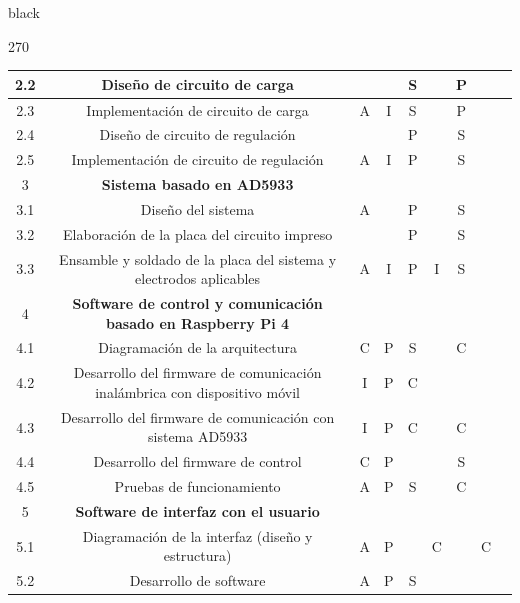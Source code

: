 \documentclass[11pt]{charter}
\begin{document}
\begin{consigna}{black}
\begin{table}[htpb]
\begin{turn}{270}
{\begin{tabular}{|c|c|c|c|c|c|c|c|c|}
2.2 & Diseño de circuito de carga &  &  & S &  & 	P &  & \\ \hline
2.3 & Implementación de circuito de carga & A & I & S &  & 	P &  & \\ \hline
2.4 & Diseño de circuito de regulación &  &  & P &  &	S &  & \\ \hline
2.5 & Implementación de circuito de regulación &  A & I & P &  & 	S &  & \\ \hline
3	 & \textbf{Sistema basado en AD5933}	&  &  &  &  &  &  & \\ \hline						
3.1	 & Diseño del sistema & A &  &	P & & S &  & \\ \hline
3.2	 & Elaboración de la placa del circuito impreso  & & & P & & S & & \\ \hline
3.3	 & Ensamble y soldado de la placa del sistema y electrodos aplicables &A &I &P &I & S &  & \\ \hline

								
4 & \textbf{Software de control y comunicación basado en Raspberry Pi 4} &  &  &  &  &  &  & \\ \hline				
4.1 & Diagramación de la arquitectura  & C & P & S & & C &  & \\ \hline
4.2 & Desarrollo del firmware de comunicación inalámbrica con dispositivo móvil &I &P & C	 & & & & \\ \hline
4.3 & Desarrollo del firmware de comunicación con sistema AD5933 & I & P & C & & C &  & \\ \hline		
4.4 & Desarrollo del firmware de control & C & P &	& &	S &  & \\ \hline
4.5 & Pruebas de funcionamiento & A & P & S & &	C &  & \\ \hline

5 & \textbf{Software de interfaz con el usuario} &  &  &  &  &  &  & \\ \hline	
5.1 & Diagramación de la interfaz (diseño y estructura)& A & P &	& C & &	C &	 \\ \hline
5.2	& Desarrollo de software &A & P & S & & & & \\ \hline								


\end{tabular}}
\end{turn}
\end{table}
\end{consigna}
\end{document}

